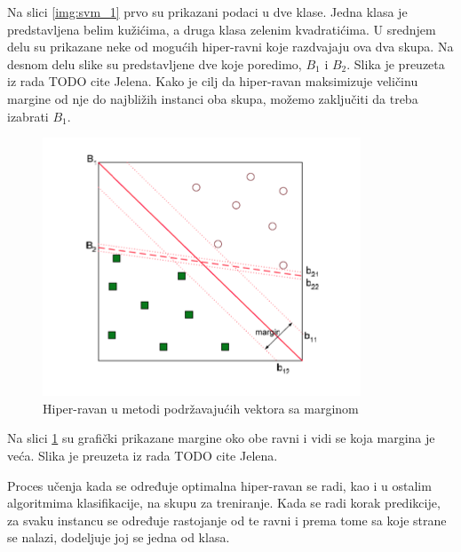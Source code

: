 \documentclass[12pt,oneside]{memoir}
\begin{document}
Na slici \ref{img:svm_1} prvo su prikazani podaci u dve klase.  Jedna klasa je predstavljena belim kužićima,  a druga klasa zelenim kvadratićima.  U srednjem delu su prikazane neke od mogućih hiper-ravni koje razdvajaju ova dva skupa.  Na desnom delu slike su predstavljene dve koje poredimo,  $B_1$ i $B_2$. Slika je preuzeta iz rada TODO cite Jelena.  Kako je cilj da hiper-ravan maksimizuje veličinu margine od nje do najbližih instanci oba skupa, možemo zaključiti da treba izabrati $B_1$. 

\begin{figure}[h!]
\centering
\includegraphics[width=.7\textwidth]{images/svm1.png}
\caption{ Hiper-ravan u metodi podržavajućih vektora sa marginom }
\label{img:svm_2}
\end{figure}
\noindent
Na slici \ref{img:svm_2} su grafički prikazane margine oko obe ravni i vidi se koja margina je veća. Slika je preuzeta iz rada TODO cite Jelena. 

Proces učenja kada se određuje optimalna hiper-ravan se radi, kao i u ostalim algoritmima klasifikacije, na skupu za treniranje.  Kada se radi korak predikcije, za svaku instancu se određuje rastojanje od te ravni i prema tome sa koje strane se nalazi, dodeljuje joj se jedna od klasa. 
\end{document}
